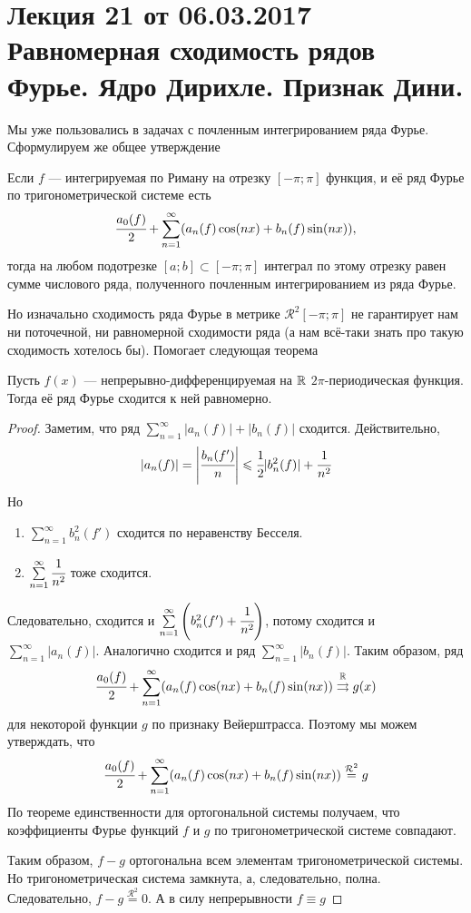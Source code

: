 \pagestyle{fancy}
\section{Лекция 21 от 06.03.2017 \\ Равномерная сходимость рядов Фурье. Ядро Дирихле. Признак Дини.}
Мы уже пользовались в задачах с почленным интегрированием ряда Фурье. Сформулируем же общее утверждение
\begin{Statement}
	Если $f$ --- интегрируемая по Риману на отрезку $[-\pi;\pi]$  функция, и её ряд Фурье по тригонометрической системе есть
	$$
		\cfrac{a_0(f)}{2} + \sum\limits_{n=1}^{\infty}(a_n(f)\cos(nx) + b_n(f)\sin(nx)),
	$$
	 тогда на любом подотрезке $[a;b] \subset [-\pi; \pi]$ интеграл по этому отрезку равен сумме числового ряда, полученного почленным интегрированием из ряда Фурье.
\end{Statement}
Но изначально сходимость ряда Фурье в метрике $\mathcal{R}^2[-\pi; \pi]$ не гарантирует нам ни поточечной, ни равномерной сходимости ряда (а нам всё-таки знать про такую сходимость хотелось бы). Помогает следующая теорема
\begin{Theorem}
	Пусть $f(x)$ --- непрерывно-дифференцируемая на $\mathbb{R}$ $2\pi$-периодическая функция. Тогда её ряд Фурье сходится к ней равномерно.
\end{Theorem}
\begin{proof}
	Заметим, что ряд $\sum\limits_{n=1}^{\infty} |a_n(f)| + |b_n(f)|$ сходится. Действительно,
	$$
		|a_n(f)| = \left|\cfrac{b_n(f')}{n}\right| \leqslant \cfrac{1}{2} |b_n^2(f)| + \cfrac{1}{n^2}
	$$
	Но
	\begin{enumerate}
		\item $\sum\limits_{n=1}^{\infty} b_n^2(f')$ сходится по неравенству Бесселя.
		\item $\sum\limits_{n=1}^{\infty} \cfrac{1}{n^2}$ тоже сходится.
	\end{enumerate}
	Следовательно, сходится и $\sum\limits_{n=1}^{\infty}\left(b_n^2(f') + \cfrac{1}{n^2}\right)$, потому сходится и $\sum \limits_{n=1}^{\infty}|a_n(f)|$. Аналогично сходится и ряд $\sum \limits_{n=1}^{\infty}|b_n(f)|$. Таким образом, ряд 
	$$
		\cfrac{a_0(f)}{2} + \sum\limits_{n=1}^{\infty}(a_n(f)\cos(nx)+ b_n(f)\sin(nx)) \overset{\mathbb{R}}{\rightrightarrows} g(x)
	$$
	для некоторой функции $g$ по признаку Вейерштрасса. Поэтому мы можем утверждать, что
	$$
		\cfrac{a_0(f)}{2} + \sum\limits_{n=1}^{\infty}(a_n(f)\cos(nx)+ b_n(f)\sin(nx)) \overset{\mathcal{R}^2}{=} g
	$$
	По теореме единственности для ортогональной системы получаем, что коэффициенты Фурье функций $f$ и $g$ по тригонометрической системе совпадают.
	\par Таким образом, $f-g$ ортогональна всем элементам тригонометрической системы. Но тригонометрическая система замкнута, а, следовательно, полна. Следовательно, $f-g \overset{\mathcal{R}^2}{=} 0$. А в силу непрерывности $f \equiv g$
\end{proof}
